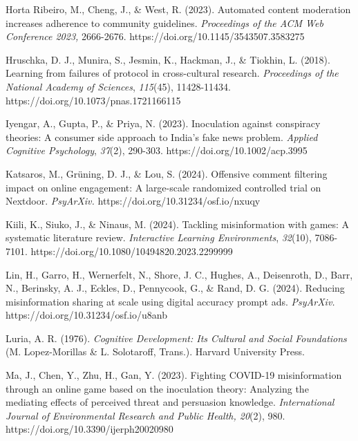 \documentclass[authordate, empirical]{jote-new-article}
\begin{document}
	Horta Ribeiro, M., Cheng, J., \& West, R. (2023). Automated content moderation increases adherence to community guidelines. \emph{Proceedings of the ACM Web Conference 2023,} 2666-2676. https://doi.org/10.1145/3543507.3583275



	Hruschka, D. J., Munira, S., Jesmin, K., Hackman, J., \& Tiokhin, L. (2018). Learning from failures of protocol in cross-cultural research. \emph{Proceedings of the National Academy of Sciences}, \emph{115}(45), 11428-11434. https://doi.org/10.1073/pnas.1721166115



	Iyengar, A., Gupta, P., \& Priya, N. (2023). Inoculation against conspiracy theories: A consumer side approach to India's fake news problem. \emph{Applied Cognitive Psychology}, \emph{37}(2), 290-303. https://doi.org/10.1002/acp.3995



	Katsaros, M., Grüning, D. J., \& Lou, S. (2024). Offensive comment filtering impact on online engagement: A large-scale randomized controlled trial on Nextdoor. \emph{PsyArXiv. }https://doi.org/10.31234/osf.io/nxuqy



	Kiili, K., Siuko, J., \& Ninaus, M. (2024). Tackling misinformation with games: A systematic literature review. \emph{Interactive Learning Environments}, \emph{32}(10), 7086-7101. https://doi.org/10.1080/10494820.2023.2299999



	Lin, H., Garro, H., Wernerfelt, N., Shore, J. C., Hughes, A., Deisenroth, D., Barr, N., Berinsky, A. J., Eckles, D., Pennycook, G., \& Rand, D. G. (2024). Reducing misinformation sharing at scale using digital accuracy prompt ads. \emph{PsyArXiv. }https://doi.org/10.31234/osf.io/u8anb



	Luria, A. R. (1976). \emph{Cognitive Development: Its Cultural and Social Foundations }(M. Lopez-Morillas \& L. Solotaroff, Trans.).\emph{ }Harvard University Press.



	Ma, J., Chen, Y., Zhu, H., Gan, Y. (2023). Fighting COVID-19 misinformation through an online game based on the inoculation theory: Analyzing the mediating effects of perceived threat and persuasion knowledge. \emph{International Journal of Environmental Research and Public Health, 20}(2), 980. https://doi.org/10.3390/ijerph20020980
\end{document}
